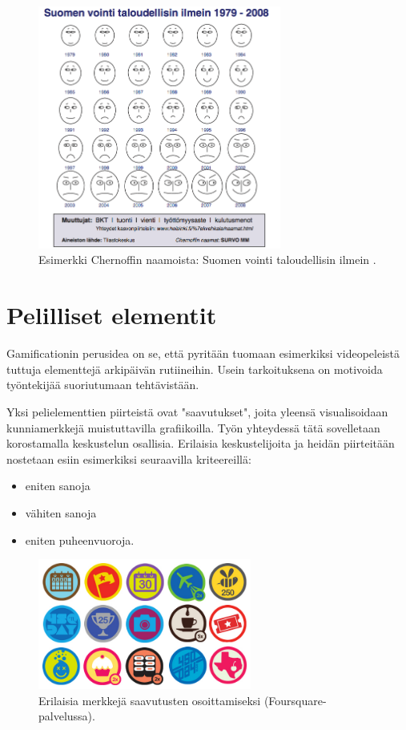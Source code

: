 \documentclass[11pt,a4paper,oneside]{memoir}
\begin{document}
\begin{figure}[H]
  \centering
  \includegraphics[width=8cm]{suomen-vointi-chernoff}
  \caption{Esimerkki Chernoffin naamoista: Suomen vointi taloudellisin ilmein \cite{helsinki:chernoffin-naamat}.}
  \label{fig:suomen-vointi-chernoff}
\end{figure}



\section{Pelilliset elementit}
Gamificationin perusidea on se, että pyritään tuomaan esimerkiksi videopeleistä tuttuja elementtejä arkipäivän rutiineihin. Usein tarkoituksena on motivoida työntekijää suoriutumaan tehtävistään.

Yksi pelielementtien piirteistä ovat "saavutukset", joita yleensä visualisoidaan kunniamerkkejä muistuttavilla grafiikoilla. Työn yhteydessä tätä sovelletaan korostamalla keskustelun osallisia. Erilaisia keskustelijoita ja heidän piirteitään nostetaan esiin esimerkiksi seuraavilla kriteereillä:
\begin{itemize}
\item{eniten sanoja}
\item{vähiten sanoja}
\item{eniten puheenvuoroja.}
\end{itemize}

\begin{figure}[H]
  \centering
  \includegraphics[width=7cm]{foursquare-kunniamerkit}
  \caption{Erilaisia merkkejä saavutusten osoittamiseksi (Foursquare-palvelussa).}
  \label{fig:foursquare-merkit}
\end{figure}
\end{document}
